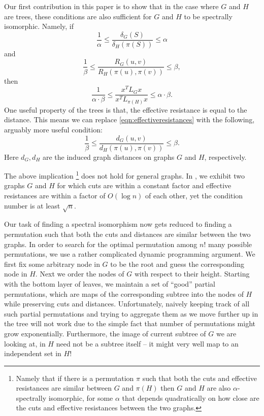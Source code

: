 Our first contribution in this paper is to show that in the case where
$G$ and $H$ are trees, these conditions are also sufficient for $G$
and $H$ to be spectrally isomorphic. Namely, if
%
\begin{equation*}
\frac{1}{\alpha} \leq \frac{\delta_G(S)}{\delta_{H}(\pi(S))} \leq \alpha
\end{equation*}
%
and 
%
\begin{equation*}
\frac{1}{\beta} \leq \frac{R_G(u,v)}{R_{H}(\pi(u),\pi(v))} \leq \beta,
\end{equation*}
%
then
%
\begin{equation*}
  \frac{1}{\alpha\cdot \beta} \leq \frac{x^T L_{G} x}{x^T L_{\pi(H)}
    x} 
  \leq \alpha \cdot \beta.
\end{equation*}
%
One useful property of the trees is that, the effective resistance is
equal to the distance. This means we can replace
\eqref{eqn:effectiveresistances} with the following, arguably more
useful condition:
%
\begin{equation}\label{eqn:distances} \frac{1}{\beta} \leq
  \frac{d_G(u,v)}{d_{H}(\pi(u),\pi(v))} \leq \beta.
\end{equation}
%
Here $d_G, d_H$ are the induced graph distances on graphs $G$ and $H$,
respectively.
%
\begin{remark} The above implication \footnote{Namely that if there is
    a permutation $\pi$ such that both the cuts and effective
    resistances are similar between $G$ and $\pi(H)$ then $G$ and $H$
    are also $\alpha$-spectrally isomorphic, for some $\alpha$ that
    depends quadratically on how close are the cuts and effective
    resistances between the two graphs.} does not hold for general
  graphs. In , we exhibit two graphs $G$ and $H$ for which
  cuts are within a constant factor and effective resistances
  are within a factor of $O(\log n)$ of each other, yet the
  condition number is at least $\sqrt{n}$.
\end{remark}
%
Our task of finding a spectral isomorphism now gets reduced to finding
a permutation such that both the cuts and distances are similar
between the two graphs. In order to search for the optimal permutation
among $n!$ many possible permutations, we use a rather complicated
dynamic programming argument. We first fix some arbitrary node in $G$
to be the root and guess the corresponding node in $H$. Next we order
the nodes of $G$ with respect to their height. Starting with the
bottom layer of leaves, we maintain a set of ``good'' partial
permutations, which are maps of the corresponding subtree into the
nodes of $H$ while preserving cuts and distances. Unfortunately,
naively keeping track of all such partial permutations and trying to
aggregate them as we move further up in the tree will not work due to
the simple fact that number of permutations might grow
exponentially. Furthermore, the image of current subtree of $G$ we are
looking at, in $H$ need not be a subtree itself -- it might very well
map to an independent set in $H$!

